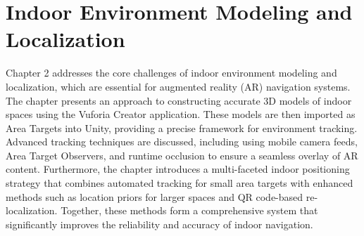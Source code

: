 \chapter{Indoor Environment Modeling and Localization}
\label{sec:Indoor Environment Modeling and Localization}
\begin{ChapAbstract}
Chapter 2 addresses the core challenges of indoor environment modeling and localization, which are essential for augmented reality (AR) navigation systems. The chapter presents an approach to constructing accurate 3D models of indoor spaces using the Vuforia Creator application. These models are then imported as Area Targets into Unity, providing a precise framework for environment tracking. Advanced tracking techniques are discussed, including using mobile camera feeds, Area Target Observers, and runtime occlusion to ensure a seamless overlay of AR content. Furthermore, the chapter introduces a multi-faceted indoor positioning strategy that combines automated tracking for small area targets with enhanced methods such as location priors for larger spaces and QR code-based re-localization. Together, these methods form a comprehensive system that significantly improves the reliability and accuracy of indoor navigation.
\end{ChapAbstract}



